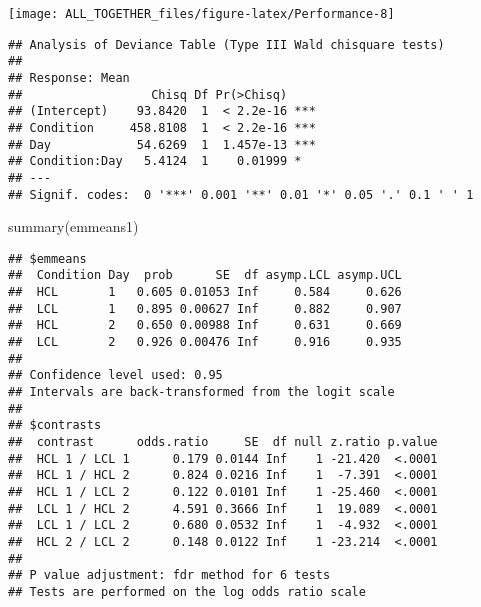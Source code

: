 \documentclass[
]{article}
\newenvironment{Shaded}{\begin{snugshade}}{\end{snugshade}}
\newcommand{\AttributeTok}[1]{\textcolor[rgb]{0.77,0.63,0.00}{#1}}
\newcommand{\DecValTok}[1]{\textcolor[rgb]{0.00,0.00,0.81}{#1}}
\newcommand{\DocumentationTok}[1]{\textcolor[rgb]{0.56,0.35,0.01}{\textbf{\textit{#1}}}}
\newcommand{\FunctionTok}[1]{\textcolor[rgb]{0.00,0.00,0.00}{#1}}
\newcommand{\NormalTok}[1]{#1}
\newcommand{\OtherTok}[1]{\textcolor[rgb]{0.56,0.35,0.01}{#1}}
\newcommand{\SpecialCharTok}[1]{\textcolor[rgb]{0.00,0.00,0.00}{#1}}
\newcommand{\StringTok}[1]{\textcolor[rgb]{0.31,0.60,0.02}{#1}}
\begin{document}
\texttt{[image: ALL\_TOGETHER\_files/figure-latex/Performance-8]}

\begin{Shaded}
\end{Shaded}

\begin{verbatim}
## Analysis of Deviance Table (Type III Wald chisquare tests)
## 
## Response: Mean
##                  Chisq Df Pr(>Chisq)    
## (Intercept)    93.8420  1  < 2.2e-16 ***
## Condition     458.8108  1  < 2.2e-16 ***
## Day            54.6269  1  1.457e-13 ***
## Condition:Day   5.4124  1    0.01999 *  
## ---
## Signif. codes:  0 '***' 0.001 '**' 0.01 '*' 0.05 '.' 0.1 ' ' 1
\end{verbatim}

\begin{Shaded}
\begin{Highlighting}[]
\FunctionTok{summary}\NormalTok{(emmeans1)}
\end{Highlighting}
\end{Shaded}

\begin{verbatim}
## $emmeans
##  Condition Day  prob      SE  df asymp.LCL asymp.UCL
##  HCL       1   0.605 0.01053 Inf     0.584     0.626
##  LCL       1   0.895 0.00627 Inf     0.882     0.907
##  HCL       2   0.650 0.00988 Inf     0.631     0.669
##  LCL       2   0.926 0.00476 Inf     0.916     0.935
## 
## Confidence level used: 0.95 
## Intervals are back-transformed from the logit scale 
## 
## $contrasts
##  contrast      odds.ratio     SE  df null z.ratio p.value
##  HCL 1 / LCL 1      0.179 0.0144 Inf    1 -21.420  <.0001
##  HCL 1 / HCL 2      0.824 0.0216 Inf    1  -7.391  <.0001
##  HCL 1 / LCL 2      0.122 0.0101 Inf    1 -25.460  <.0001
##  LCL 1 / HCL 2      4.591 0.3666 Inf    1  19.089  <.0001
##  LCL 1 / LCL 2      0.680 0.0532 Inf    1  -4.932  <.0001
##  HCL 2 / LCL 2      0.148 0.0122 Inf    1 -23.214  <.0001
## 
## P value adjustment: fdr method for 6 tests 
## Tests are performed on the log odds ratio scale
\end{verbatim}
\end{document}
